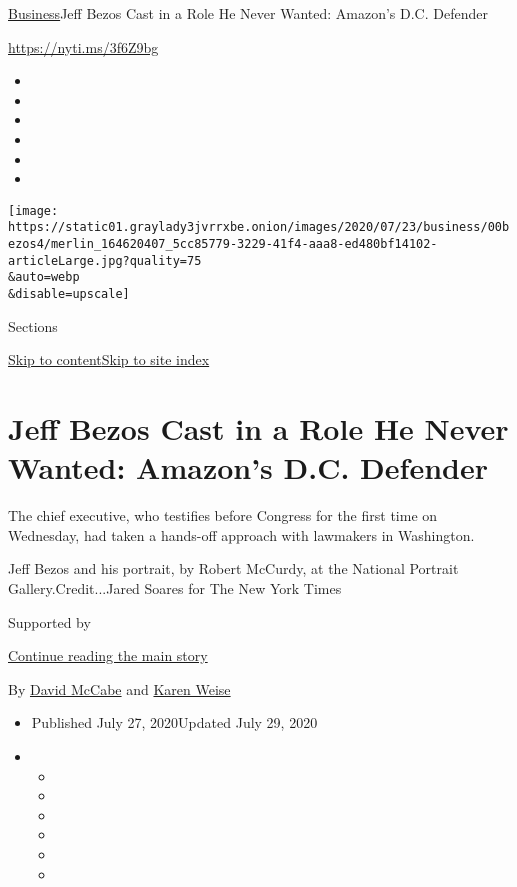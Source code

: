 \href{/section/business}{Business}\textbar{}Jeff Bezos Cast in a Role He
Never Wanted: Amazon's D.C. Defender

\url{https://nyti.ms/3f6Z9bg}

\begin{itemize}
\item
\item
\item
\item
\item
\item
\end{itemize}

\texttt{[image: https://static01.graylady3jvrrxbe.onion/images/2020/07/23/business/00bezos4/merlin\_164620407\_5cc85779-3229-41f4-aaa8-ed480bf14102-articleLarge.jpg?quality=75\\\&auto=webp\\\&disable=upscale]}

Sections

\protect\hyperlink{site-content}{Skip to
content}\protect\hyperlink{site-index}{Skip to site index}

\hypertarget{jeff-bezos-cast-in-a-role-he-never-wanted-amazons-dc-defender}{%
\section{Jeff Bezos Cast in a Role He Never Wanted: Amazon's D.C.
Defender}\label{jeff-bezos-cast-in-a-role-he-never-wanted-amazons-dc-defender}}

The chief executive, who testifies before Congress for the first time on
Wednesday, had taken a hands-off approach with lawmakers in Washington.

Jeff Bezos and his portrait, by Robert McCurdy, at the National Portrait
Gallery.Credit...Jared Soares for The New York Times

Supported by

\protect\hyperlink{after-sponsor}{Continue reading the main story}

By \href{https://www.nytimes3xbfgragh.onion/by/david-mccabe}{David
McCabe} and
\href{https://www.nytimes3xbfgragh.onion/by/karen-weise}{Karen Weise}

\begin{itemize}
\item
  Published July 27, 2020Updated July 29, 2020
\item
  \begin{itemize}
  \item
  \item
  \item
  \item
  \item
  \item
  \end{itemize}
\end{itemize}

